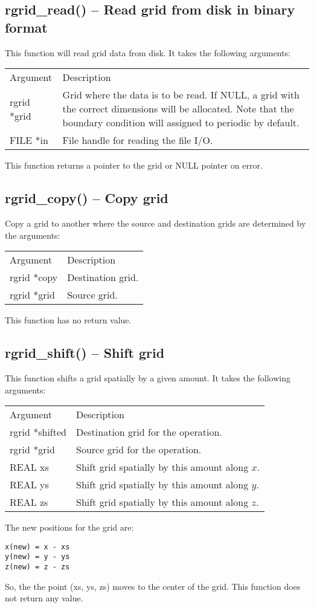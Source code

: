 \documentclass[12pt,letterpaper]{report}
\begin{document}
\subsection{rgrid\_read() -- Read grid from disk in binary format}

This function will read grid data from disk. It takes the following arguments:
\begin{longtable}{p{} p{}}
Argument & Description\\
\cline{1-2}
rgrid *grid & Grid where the data is to be read. If NULL, a grid with the correct dimensions will be allocated. Note that the boundary condition will assigned to periodic by default.\\
FILE *in & File handle for reading the file I/O.\\
\end{longtable}
This function returns a pointer to the grid or NULL pointer on error.

\subsection{rgrid\_copy() -- Copy grid}

Copy a grid to another where the source and destination grids are determined by the arguments:
\begin{longtable}{p{} p{}}
Argument & Description\\
\cline{1-2}
rgrid *copy & Destination grid.\\
rgrid *grid & Source grid.\\
\end{longtable}
\noindent
This function has no return value.

\subsection{rgrid\_shift() -- Shift grid}

This function shifts a grid spatially by a given amount. It takes the following arguments:
\begin{longtable}{p{} p{}}
Argument & Description\\
\cline{1-2}
rgrid *shifted & Destination grid for the operation.\\
rgrid *grid & Source grid for the operation.\\
REAL xs & Shift grid spatially by this amount along $x$.\\
REAL ys & Shift grid spatially by this amount along $y$.\\
REAL zs & Shift grid spatially by this amount along $z$.\\
\end{longtable}
\noindent
The new positions for the grid are:
\begin{verbatim}
x(new) = x - xs 
y(new) = y - ys 
z(new) = z - zs
\end{verbatim}
\noindent
So, the the point (xs, ys, zs) moves to the center of the grid. This function does not return any value.
\end{document}
